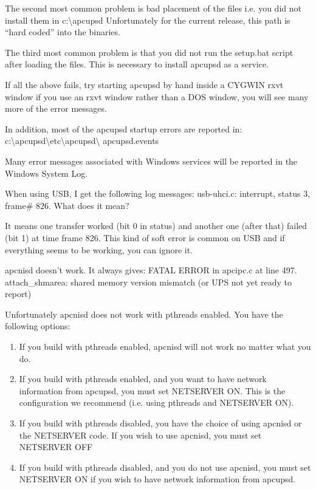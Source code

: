 {{{{{{{{\begin{description}
{{{The second most common problem is bad placement of the files i.e. you did not
install them in c:\textbackslash{}apcupsd Unfortunately for the current
release, this path is ``hard coded'' into the binaries.  

The third most common problem is that you did not run the setup.bat script
after loading the files. This is necessary to install apcupsd as a service.  

If all the above fails, try starting apcupsd by hand inside a CYGWIN rxvt
window if you use an rxvt window rather than a DOS window, you will see many
more of the error messages.  

In addition, most of the apcupsd startup errors are reported in:
c:\textbackslash{}apcupsd\textbackslash{}etc\textbackslash{}apcupsd\textbackslash
{}apcupsd.events  

Many error messages associated with Windows services will be reported in the
Windows System Log.  

\item [Q:]
   When using USB, I get the following log messages: usb-uhci.c: interrupt,
status 3, frame\# 826. What does it mean?  

\item [A:]
   It means one transfer worked (bit 0 in status) and another one (after that)
failed (bit 1) at time frame 826. This kind of soft error is common on USB and
if everything seems to be working, you can ignore it.  

\item [Q:]
   apcnisd doesn't work. It always gives: FATAL ERROR in apcipc.c at line 497.
attach\_shmarea: shared memory version mismatch (or UPS not yet ready to
report)  

\item [A:]
   Unfortunately apcnisd does not work with pthreads enabled. You have the
following options:  

\begin{enumerate}
\item If you build with pthreads enabled, apcnisd will not work no matter what
   you do.  
\item If you build with pthreads enabled, and you want to have network
   information from apcupsd, you must set NETSERVER ON. This is the configuration
   we recommend (i.e. using pthreads and NETSERVER ON).  
\item If you build with pthreads disabled, you have the choice of using
   apcnisd or the NETSERVER code. If you wish to use apcnisd, you must set
   NETSERVER OFF  
\item If you build with pthreads disabled, and you do not use apcnisd, you
   must set NETSERVER ON if you wish to have network information from apcupsd.  
   \end{enumerate}

}}}
\end{description}}}}}}}}}
